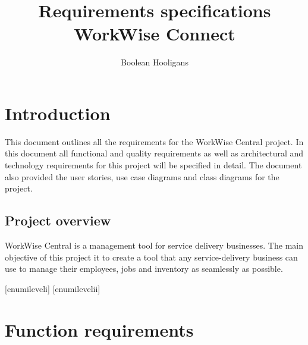 \documentclass{article}
\title{%
	Requirements specifications \\
	\large WorkWise Connect}
\author{Boolean Hooligans}
\begin{document}
	
	\maketitle
	\newpage
	
	\section*{Introduction}	
	
	This document outlines all the requirements for the WorkWise Central project. In this document all functional and quality requirements as well as architectural and technology requirements for this project will be specified in detail. The document also provided the user stories, use case diagrams and class diagrams for the project. 
	
	\subsection*{Project overview}	
	WorkWise Central is a management tool for service delivery businesses. The main objective of this project it to create a tool that any service-delivery business can use to manage their employees, jobs and inventory as seamlessly as possible.  
	
	\newpage
	
	[enumileveli]
	[enumilevelii]
	
	
	\section*{Function requirements}
\end{document}
